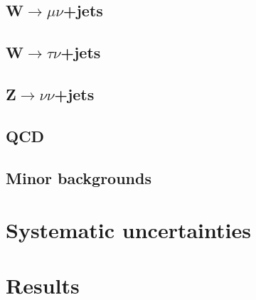 \subsection{W$\rightarrow \mu\nu$+jets}%
\label{sec:parkedwmunu}

\subsection{W$\rightarrow \tau\nu$+jets}%
\label{sec:parkedwtaunu}

\subsection{Z$\rightarrow \nu\nu$+jets}%
\label{sec:parkedznunu}

\subsection{QCD}%
\label{sec:parkedQCD}

\subsection{Minor backgrounds}%
\label{sec:parkedminor}

\section{Systematic uncertainties}%
\label{sec:parkedsyst}

\section{Results}%
\label{sec:parkedresults}
